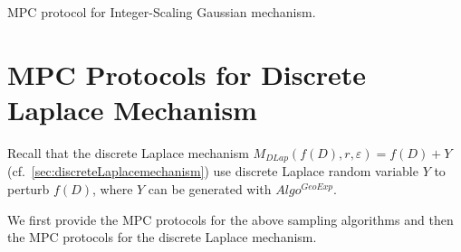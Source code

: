       \begin{protocol}[tbh!]
            \centering
            \caption{MPC protocol for Integer-Scaling Gaussian mechanism.}
            \label{prot:ISGauss}
      \end{protocol}
      \FloatBarrier


      \section{MPC Protocols for Discrete Laplace Mechanism}
      \label{sec:MPCProtocolsforDiscreteLaplaceMechanism}

      Recall that the discrete Laplace mechanism $M_{DLap}\left(f\left(D\right),r,\varepsilon\right)=f\left(D\right) +Y$ (cf.~\autoref{sec:discreteLaplacemechanism}) use discrete Laplace random variable $Y $ to perturb $f\left(D\right)$, where $Y$ can be generated with $Algo^{GeoExp}$.


      We first provide the MPC protocols for the above sampling algorithms and then the MPC protocols for the discrete Laplace mechanism.



